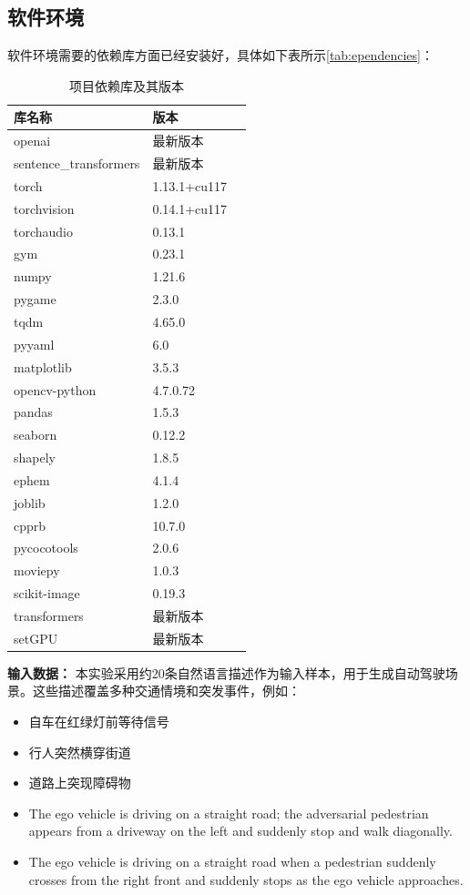 \subsection*{软件环境}
软件环境需要的依赖库方面已经安装好，具体如下表所示\ref{tab:ependencies}：
	\begin{table}[H]
		\centering
			\begin{tabular}{lll}
			\hline
			\textbf{库名称} & \textbf{版本} \\
			\hline
			openai & 最新版本 \\
			sentence\_transformers & 最新版本 \\
			torch & 1.13.1+cu117 \\
			torchvision & 0.14.1+cu117 \\
			torchaudio & 0.13.1 \\
			gym & 0.23.1 \\
			numpy & 1.21.6 \\
			pygame & 2.3.0 \\
			tqdm & 4.65.0 \\
			pyyaml & 6.0 \\
			matplotlib & 3.5.3 \\
			opencv-python & 4.7.0.72 \\
			pandas & 1.5.3 \\
			seaborn & 0.12.2 \\
			shapely & 1.8.5 \\
			ephem & 4.1.4 \\
			joblib & 1.2.0 \\
			cpprb & 10.7.0 \\
			pycocotools & 2.0.6 \\
			moviepy & 1.0.3 \\
			scikit-image & 0.19.3 \\
			transformers & 最新版本 \\
			setGPU & 最新版本 \\
			\hline
		\end{tabular}
		\caption{项目依赖库及其版本}
		\label{tab:dependencies}
	\end{table}
	
\textbf{输入数据：} 本实验采用约20条自然语言描述作为输入样本，用于生成自动驾驶场景。这些描述覆盖多种交通情境和突发事件，例如：



\begin{itemize}[leftmargin=20pt]
	\item 自车在红绿灯前等待信号
	\item 行人突然横穿街道
	\item 道路上突现障碍物
	\item The ego vehicle is driving on a straight road; the adversarial pedestrian appears from a driveway on the left and suddenly stop and walk diagonally.
	\item The ego vehicle is driving on a straight road when a pedestrian suddenly crosses from the right front and suddenly stops as the ego vehicle approaches.
\end{itemize}

